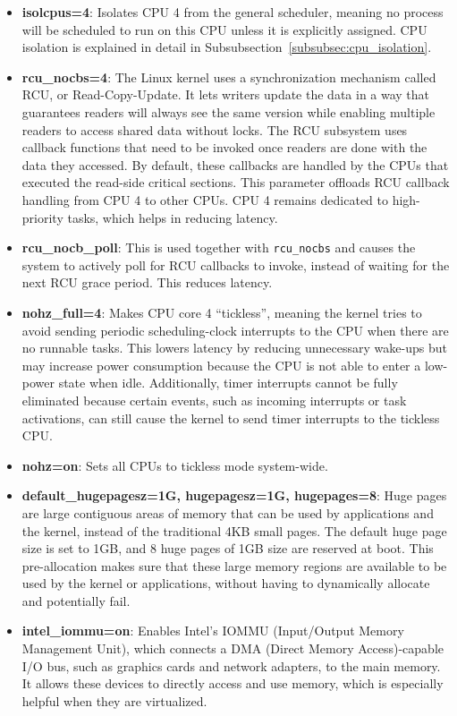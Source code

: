 \documentclass[MMR,Master,english]{style/twbook}
\begin{document}
\begin{itemize}
	\item \textbf{isolcpus=4}: Isolates CPU 4 from the general scheduler, meaning no process will be scheduled to run on this CPU unless it is explicitly assigned. CPU isolation is explained in detail in Subsubsection~\ref{subsubsec:cpu_isolation}.
	\item \textbf{rcu\_nocbs=4}: The Linux kernel uses a synchronization mechanism called RCU, or Read-Copy-Update. It lets writers update the data in a way that guarantees readers will always see the same version while enabling multiple readers to access shared data without locks. The RCU subsystem uses callback functions that need to be invoked once readers are done with the data they accessed. By default, these callbacks are handled by the CPUs that executed the read-side critical sections. This parameter offloads RCU callback handling from CPU 4 to other CPUs. CPU 4 remains dedicated to high-priority tasks, which helps in reducing latency.
	\item \textbf{rcu\_nocb\_poll}: This is used together with \texttt{rcu\_nocbs} and causes the system to actively poll for RCU callbacks to invoke, instead of waiting for the next RCU grace period. This reduces latency.
	\item \textbf{nohz\_full=4}: Makes CPU core 4 ``tickless'', meaning the kernel tries to avoid sending periodic scheduling-clock interrupts to the CPU when there are no runnable tasks. This lowers latency by reducing unnecessary wake-ups but may increase power consumption because the CPU is not able to enter a low-power state when idle. Additionally, timer interrupts cannot be fully eliminated because certain events, such as incoming interrupts or task activations, can still cause the kernel to send timer interrupts to the tickless CPU.
	\item \textbf{nohz=on}: Sets all CPUs to tickless mode system-wide.
	\item \textbf{default\_hugepagesz=1G, hugepagesz=1G, hugepages=8}: Huge pages are large contiguous areas of memory that can be used by applications and the kernel, instead of the traditional 4KB small pages. The default huge page size is set to 1GB, and 8 huge pages of 1GB size are reserved at boot. This pre-allocation makes sure that these large memory regions are available to be used by the kernel or applications, without having to dynamically allocate and potentially fail.
	\item \textbf{intel\_iommu=on}: Enables Intel's IOMMU (Input/Output Memory Management Unit), which connects a DMA (Direct Memory Access)-capable I/O bus, such as graphics cards and network adapters, to the main memory. It allows these devices to directly access and use memory, which is especially helpful when they are virtualized.

\end{itemize}
\end{document}
